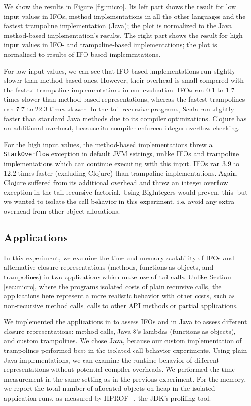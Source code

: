 We show the results in Figure \ref{fig:micro}. Its left part shows
the result for low input values in IFOs, method implementations in all
the other languages and the fastest trampoline implementation (Java);
the plot is normalized to the Java method-based
implementation's results. The right part shows the result for high input values
in IFO- and trampoline-based implementations; the plot is normalized to results of 
IFO-based implementations.

For low input values, we can see that IFO-based implementations run
slightly slower than method-based ones. However, their overhead is
small compared with the fastest trampoline implementations in our
evaluation. IFOs ran 0.1 to 1.7-times slower than method-based
representations, whereas the fastest trampolines ran 7.7 to 22.3-times
slower. In the tail recursive programs, Scala ran slightly faster than
standard Java methods due to its compiler optimizations. Clojure has
an additional overhead, because its compiler enforces integer overflow
checking.

For the high input values, the method-based implementations threw a
\lstinline{StackOverflow} exception in default JVM settings, unlike
IFOs and trampoline implementations which can continue executing with
this input. IFOs ran 3.9 to 12.2-times faster (excluding Clojure) than
trampoline implementations. Again, Clojure suffered from its
additional overhead and threw an integer overflow exception in the
tail recursive factorial. Using BigIntegers would prevent this, but
we wanted to isolate the call behavior in this experiment, i.e. avoid
any extra overhead from other object allocations.

\subsection{Applications}

In this experiment, we examine the time and memory scalability of IFOs
and alternative closure representations (methods,
functions-as-objects, and trampolines) in two applications which
make use of tail calls. Unlike Section \ref{sec:micro}, where
the programs isolated costs of plain recursive calls, the applications
here represent a more realistic behavior with other costs, such as
non-recursive method calls, calls to other API methods or partial applications.

We implemented the applications in \name to assess
IFOs and in Java to assess different closure representations: method
calls, Java 8's lambdas (functions-as-objects), and custom
trampolines. We chose Java, because our custom implementation of
trampolines performed best in the isolated call behavior
experiments. Using plain Java implementations, we can examine the
runtime behavior of different representations without potential
compiler overheads.  We performed the time measurement in the same
setting as in the previous experiment. For the memory, we report the
total number of allocated objects on heap in the isolated application
runs, as measured by HPROF~ \cite{hprof}, the JDK's profiling tool.

